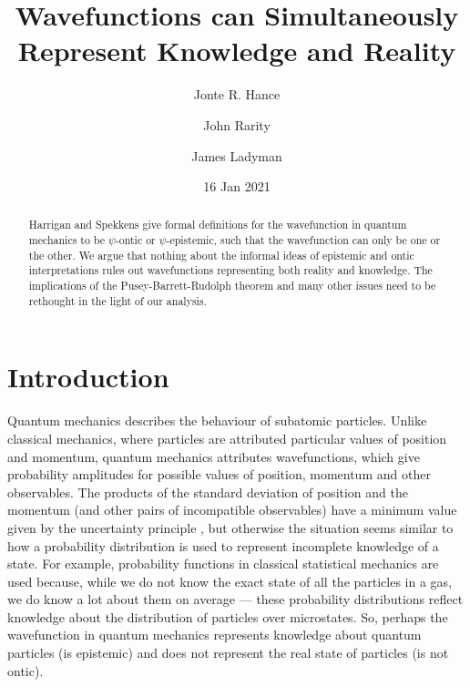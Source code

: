 \documentclass[superscriptaddress, floatfix,nofootinbib,12pt]{revtex4-2}
\begin{document}
\title{Wavefunctions can Simultaneously Represent Knowledge and Reality}

\author{Jonte R. Hance}
\author{John Rarity}
\author{James Ladyman}
\date{16 Jan 2021}

\begin{abstract}

Harrigan and Spekkens give formal definitions for the wavefunction in quantum mechanics to be $\psi$-ontic or $\psi$-epistemic, such that the wavefunction can only be one or the other. We argue that nothing about the informal ideas of epistemic and ontic interpretations rules out wavefunctions representing both reality and knowledge. The implications of the Pusey-Barrett-Rudolph theorem and many other issues need to be rethought in the light of our analysis.

\end{abstract}

\maketitle

\section{Introduction}

Quantum mechanics describes the behaviour of subatomic particles. Unlike classical mechanics, where particles are attributed particular values of position and momentum, quantum mechanics attributes wavefunctions, which give probability amplitudes for possible values of position, momentum and other observables. The products of the standard deviation of position and the momentum (and other pairs of incompatible observables) have a minimum value given by the uncertainty principle \cite{Kennard1927Quantenmechanik}, but otherwise the situation seems similar to how a probability distribution is used to represent incomplete knowledge of a state. For example, probability functions in classical statistical mechanics are used because, while we do not know the exact state of all the particles in a gas, we do know a lot about them on average --- these probability distributions reflect knowledge about the distribution of particles over microstates. So, perhaps the wavefunction in quantum mechanics represents knowledge about quantum particles (is epistemic) and does not represent the real state of particles (is not ontic).
\end{document}
